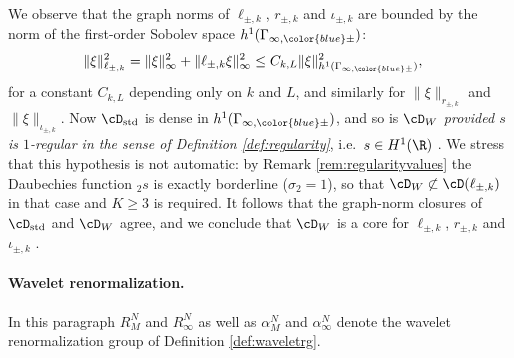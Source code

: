 \documentclass[a4paper, 11pt]{article}
\DeclareMathOperator{\1}{\mathds{1}}
\DeclareMathOperator{\std}{std}
\begin{document}
We observe that the graph norms of $\ell_{\pm,k} $, $r_{\pm,k}$ and $\iota_{\pm,k}$ are bounded by the norm of the first-order Sobolev space $h^{1}(\Gamma_{\infty,{\color{blue}\pm}})$:
\begin{align*}
\|\xi\|_{\ell_{\pm,k}}^{2} & = \|\xi\|_{\infty}^{2}+\|\ell_{\pm,k}\xi\|_{\infty}^{2} \leq C_{k,L}\|\xi\|_{h^{1}(\Gamma_{\infty,{\color{blue}\pm}})}^{2},
\end{align*}
for a constant $C_{k,L}$ depending only on $k$ and $L$, and similarly for $\|\xi\|_{r_{\pm,k}}$ and $\|\xi\|_{\iota_{\pm,k}}$. Now $\cD_{\std}$ is dense in $h^{1}(\Gamma_{\infty,{\color{blue}\pm}})$, and so is $\cD_{W}$ \emph{provided $s$ is $1$-regular in the sense of Definition \ref{def:regularity}}, i.e.~$s\in H^{1}(\R)$ \cite{WASA}. We stress that this hypothesis is not automatic: by Remark \ref{rem:regularityvalues} the Daubechies function $_{2}s$ is exactly borderline ($\sigma_{2}=1$), so that $\cD_{W}\not\subset\cD(\ell_{\pm,k})$ in that case and $K\geq3$ is required. It follows that the graph-norm closures of $\cD_{\std}$ and $\cD_{W}$ agree, and we conclude that $\cD_{W}$ is a core for $\ell_{\pm,k}$, $r_{\pm,k}$ and $\iota_{\pm,k}$ \cite{ReedMethodsOfModern1}.

\paragraph{Wavelet renormalization.}
\label{sec:KSconvwav}
In this paragraph $R^{N}_{M}$ and $R^{N}_{\infty}$ as well as $\alpha^{N}_{M}$ and $\alpha^{N}_{\infty}$ denote the wavelet renormalization group of Definition \ref{def:waveletrg}.
\end{document}
